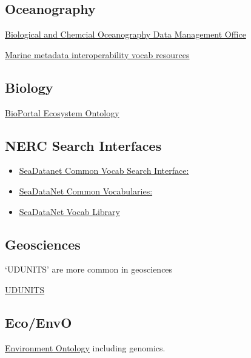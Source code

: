 \documentclass[]{book}
\begin{document}
\hypertarget{oceanography}{%
\subsection{Oceanography}\label{oceanography}}

\href{http://www.bco-dmo.org/}{Biological and Chemcial Oceanography Data Management Office}

\href{https://mmisw.org/ont/\#/}{Marine metadata interoperability vocab resources}

\hypertarget{biology}{%
\subsection{Biology}\label{biology}}

\href{http://bioportal.bioontology.org/ontologies/ECSO}{BioPortal Ecosystem Ontology}

\hypertarget{nerc-search-interfaces}{%
\subsection{NERC Search Interfaces}\label{nerc-search-interfaces}}

\begin{itemize}
\item
  \href{http://seadatanet.maris2.nl/v_bodc_vocab_v2/welcome.asp}{SeaDatanet Common Vocab Search Interface:}
\item
  \href{https://www.seadatanet.org/Standards/Common-Vocabularies/}{SeaDataNet Common Vocabularies:}
\item
  \href{http://seadatanet.maris2.nl/v_bodc_vocab_v2/vocab_relations.asp?lib=P08}{SeaDataNet Vocab Library}
\end{itemize}

\hypertarget{geosciences}{%
\subsection{Geosciences}\label{geosciences}}

`UDUNITS' are more common in geosciences

\href{https://www.unidata.ucar.edu/software/udunits/}{UDUNITS}

\hypertarget{ecoenvo}{%
\subsection{Eco/EnvO}\label{ecoenvo}}

\href{\%22http://www.obofoundry.org/ontology/envo.html\%22}{Environment Ontology} including genomics.
\end{document}
